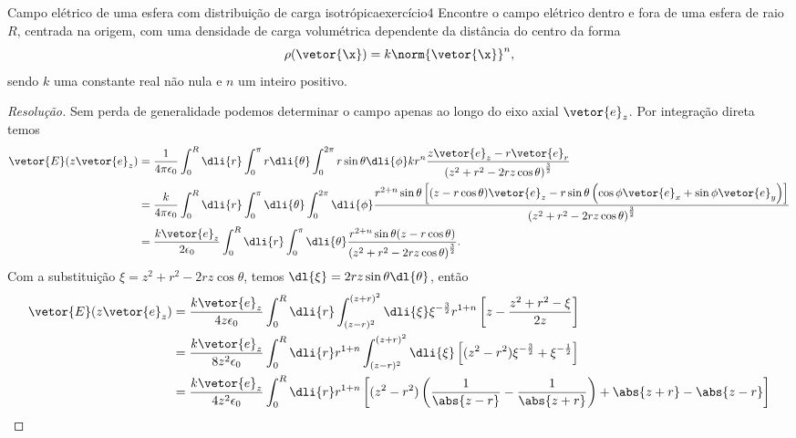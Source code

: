 \begin{exercício}{Campo elétrico de uma esfera com distribuição de carga isotrópica}{exercício4}
    Encontre o campo elétrico dentro e fora de uma esfera de raio \(R\), centrada na origem, com uma densidade de carga volumétrica dependente da distância do centro da forma
    \begin{equation*}
     \rho(\vetor{\x}) = k \norm{\vetor{\x}}^n,
    \end{equation*}
    sendo \(k\) uma constante real não nula e \(n\) um inteiro positivo.
\end{exercício}
\begin{proof}[Resolução]
    Sem perda de generalidade podemos determinar o campo apenas ao longo do eixo axial \(\vetor{e}_z\). Por integração direta temos
    \begin{align*}
        \vetor{E}(z\vetor{e}_z) &= \frac{1}{4\pi \epsilon_0} \int_{0}^R \dli{r} \int_{0}^{\pi} r\dli{\theta} \int_{0}^{2\pi} r\sin\theta \dli{\phi} kr^n\frac{z\vetor{e}_z - r\vetor{e}_r}{\left(z^2 + r^2 - 2rz \cos\theta\right)^{\frac32}}\\
                                &= \frac{k}{4\pi \epsilon_0} \int_{0}^{R} \dli{r} \int_{0}^{\pi} \dli{\theta} \int_{0}^{2\pi} \dli{\phi} \frac{r^{2+n} \sin\theta\left[(z - r \cos \theta) \vetor{e}_z - r\sin\theta \left(\cos\phi \vetor{e}_x + \sin\phi\vetor{e}_y\right) \right]}{\left(z^2 + r^2 - 2rz \cos\theta\right)^{\frac32}}\\
                                &= \frac{k\vetor{e}_z}{2\epsilon_0} \int_{0}^{R} \dli{r} \int_{0}^{\pi} \dli{\theta} \frac{r^{2+n} \sin\theta(z - r \cos \theta)  }{\left(z^2 + r^2 - 2rz \cos\theta\right)^{\frac32}}.
    \end{align*}
    Com a substituição \(\xi = z^2 + r^2 - 2rz \cos\theta\), temos \(\dl{\xi} = 2rz \sin\theta \dl{\theta}\), então
    \begin{align*}
        \vetor{E}(z\vetor{e}_z) &= \frac{k\vetor{e}_z}{4z \epsilon_0} \int_0^R\dli{r} \int_{(z - r)^2}^{(z+r)^2} \dli{\xi} \xi^{-\frac32} r^{1 + n} \left[z - \frac{z^2 + r^2 - \xi}{2z}\right]\\
                                &= \frac{k\vetor{e}_z}{8z^2 \epsilon_0} \int_0^R \dli{r} r^{1 + n} \int_{(z-r)^2}^{(z+r)^2}\dli{\xi} \left[(z^2 - r^2)\xi^{-\frac32} + \xi^{-\frac12}\right]\\
                                &= \frac{k\vetor{e}_z}{4z^2 \epsilon_0} \int_0^R \dli{r} r^{1+n} \left[(z^2 - r^2)\left(\frac{1}{\abs{z-r}} - \frac{1}{\abs{z+r}}\right) + \abs{z+r} - \abs{z - r}\right]\\

\end{align*}
\end{proof}
